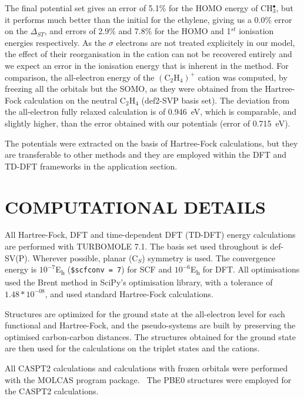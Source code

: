 \documentclass[12pt]{article}
\begin{document}
The final potential set gives an error of 5.1\% for the HOMO energy of CH\(^{\bullet}_{3}\), but it
performs much better than the initial for the ethylene,
giving us a 0.0\% error on the $\Delta_{ST}$, and errors of 2.9\% and 7.8\% for the HOMO and 1$^{st}$ ionisation energies respectively.
As the $\sigma$ electrons are not treated explicitely in our model,
the effect of their reorganisation in the cation can not
be recovered entirely and we expect an error in the ionisation energy that is inherent
in the method. For comparison, the all-electron energy of the $(\text{C}_2\text{H}_4)^+$ cation
was computed, by freezing all the orbitals but the SOMO, as they were obtained from
the Hartree-Fock calculation on the neutral $\text{C}_2\text{H}_4$ (def2-SVP basis set).
The deviation from the all-electron fully relaxed calculation is of 0.946~eV, which
is comparable, and slightly higher, than the error obtained with
our potentials (error of 0.715~eV).

The potentials were extracted on the basis of Hartree-Fock calculations, but they are transferable
to other methods and they are employed within the DFT and TD-DFT frameworks in the application section.

\section*{\sffamily \large COMPUTATIONAL DETAILS}

All Hartree-Fock, DFT and time-dependent DFT (TD-DFT) energy calculations are performed with TURBOMOLE 7.1.\cite{TURBOMOLE} The basis set used throughout is def-SV(P).\cite{defsvp} Wherever possible, planar (C\(_{S}\)) symmetry is used. The convergence energy is \(10^{-7}\)E\textsubscript{h} (\texttt{\$scfconv = 7}) for SCF and \(10^{-6}\)E\textsubscript{h} for DFT. All optimisations used the Brent method in SciPy's optimisation library, with a tolerance of \(1.48*10^{-08}\), and used standard Hartree-Fock calculations.\cite{scipy}

Structures are optimized for the ground state at the all-electron level for each functional and Hartree-Fock,
and the pseudo-systems are built by preserving the optimised carbon-carbon distances.
The structures obtained for the ground state are then used for the calculations on the triplet states and
the cations.

All CASPT2 calculations and calculations with frozen orbitals were performed with the 
MOLCAS program package.~\cite{MOLCAS} The PBE0 structures were employed for the
CASPT2 calculations.
\end{document}
